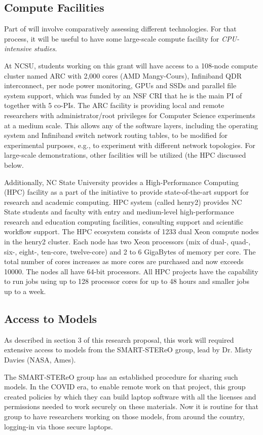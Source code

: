 \documentclass[twoside]{NSF}
\newcommand{\IT}{{\sffamily {\em \mbox{ADVICE}}}}
\begin{document}
\begin{nsffacilities}
\subsection*{Compute Facilities}
Part of {\IT} will involve comparatively assessing different technologies. For that process, it will be useful to have some large-scale compute facility for \textit{CPU-intensive studies}.
 
At NCSU, students working on this grant will have access to a 108-node compute cluster named ARC with 2,000 cores (AMD Mangy-Cours), Infiniband QDR interconnect, per node power monitoring, GPUs and SSDs and parallel file system support,
which was funded by an NSF CRI that he is the main PI of together with 5 co-PIs.  
The ARC facility is providing local and remote researchers with administrator/root privileges for Computer Science experiments at a
medium scale. This allows any of the software layers, including the operating system and Infiniband switch network routing tables, to be
modified for experimental purposes, e.g., to experiment with different
network topologies.  For large-scale demonstrations, other 
facilities will be utilized (the HPC discussed below.


Additionally, NC State University provides a High-Performance Computing (HPC) facility as a part of the initiative to provide state-of-the-art support for research and academic computing. HPC system (called henry2) provides NC State students and faculty with entry and medium-level high-performance research and education computing facilities, consulting support and scientific workflow support. The HPC ecosystem consists of 1233 dual Xeon compute nodes in the henry2 cluster. Each node has two Xeon processors (mix of dual-, quad-, six-, eight-, ten-core, twelve-core) and 2 to 6 GigaBytes of memory per core. The total number of cores increases as more cores are purchased and now exceeds 10000. The nodes all have 64-bit processors. All HPC projects have the capability to run jobs using up to 128 processor cores for up to 48 hours and smaller jobs up to a week.

 \subsection*{Access to Models}

As described in section 3 of this research proposal,
this work will required extensive access to models
from the   SMART-STEReO group, lead by
Dr. Misty Davies
(NASA, Ames).

The   SMART-STEReO group has an established procedure for
sharing such models. In the COVID era, to enable remote work on that project, this group created policies
by which they can build laptop software with all the licenses and permissions needed to work securely
on these materials. Now it is routine for that group to have researchers working on those models, from
around the country, logging-in via those secure laptops.



\end{nsffacilities}
\end{document}
